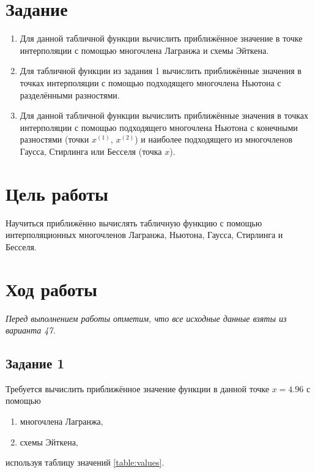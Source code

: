 \section{Задание}
\begin{enumerate}
    \item[1)] Для данной табличной функции вычислить приближённое значение в точке интерполяции с помощью многочлена Лагранжа и схемы Эйткена.

    \item[2)] Для табличной функции из задания 1 вычислить приближённые значения в точках интерполяции с помощью подходящего многочлена Ньютона с разделёнными разностями.

    \item[3)] Для данной табличной функции вычислить приближённые значения в точках интерполяции с помощью подходящего многочлена Ньютона с конечными разностями (точки $x^{(1)}$, $x^{(2)}$) и наиболее подходящего из многочленов Гаусса, Стирлинга или Бесселя (точка $x$).
\end{enumerate}

\section{Цель работы}
Научиться приближённо вычислять табличную функцию с помощью интерполяционных многочленов Лагранжа, Ньютона, Гаусса, Стирлинга и Бесселя.

\section{Ход работы}

\textit{Перед выполнением работы отметим, что все исходные данные взяты из варианта 47.}

\subsection{Задание 1}
Требуется вычислить приближённое значение функции в данной точке $x = 4.96$ с помощью
\begin{enumerate}
    \item[а)] многочлена Лагранжа,
    \item[б)] схемы Эйткена,
\end{enumerate}
используя таблицу значений \ref{table:values}.

\begin{table}[H]
    \centering
    \caption{Значения $x_i,y_i$ для построения интерполяционного многочлена}
    \label{table:values}
\end{table}

